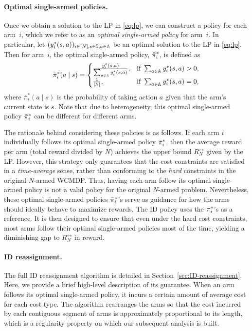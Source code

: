 \documentclass[11pt,letterpaper]{article}
\begin{document}
\paragraph{Optimal single-armed policies.}
Once we obtain a solution to the LP in \eqref{eq:lp}, we can construct a policy for each arm~$i$, which we refer to as an \emph{optimal single-armed policy} for arm~$i$.
In particular, let $(y^*_i(s,a))_{i\in [N], s\in\mathbb{S},a\in\mathbb{A}}$ be an optimal solution to the LP in \eqref{eq:lp}.
Then for arm~$i$, the optimal single-armed policy, ${\bar{\pi}}^*_i$, is defined as
\begin{equation}\label{eq:optimal-single-armed-policy}
    \bar{\pi}_i^*(a\mid s) = \begin{cases}
        \frac{y^*_i(s,a)}{\sum_{a\in\mathbb{A}}y^*_i(s,a)}, & \text{if}~ \sum_{a\in\mathbb{A}}y^*_i(s,a) >0,\\
        \frac{1}{\lvert\mathbb{A}\rvert}, &  \text{if} ~\sum_{a\in\mathbb{A}}y^*_i(s,a)=0,
    \end{cases}
\end{equation}
where $\bar{\pi}_i^*(a\mid s)$ is the probability of taking action $a$ given that the arm's current state is $s$.
Note that due to heterogeneity, this optimal single-armed policy ${\bar{\pi}}^*_i$ can be different for different arms.


The rationale behind considering these policies is as follows.
If each arm $i$ individually follows its optimal single-armed policy ${\bar{\pi}}_i^*$, then the average reward per arm (total reward divided by $N$) achieves the upper bound $R_N^{\rel}$ given by the LP.
However, this strategy only guarantees that the cost constraints are satisfied in a \emph{time-average} sense, rather than conforming to the \emph{hard} constraints in the original $N$-armed WCMDP.
Thus, having each arm follow its optimal single-armed policy is not a valid policy for the original $N$-armed problem.
Nevertheless, these optimal single-armed policies ${\bar{\pi}}_i^*$'s serve as guidance for how the arms should ideally behave to maximize rewards.
The ID policy uses the ${\bar{\pi}}_i^*$'s as a reference.
It is then designed to ensure that even under the hard cost constraints, most arms follow their optimal single-armed policies most of the time, yielding a diminishing gap to $R_N^{\rel}$ in reward.

\paragraph{ID reassignment.}
The full ID reassignment algorithm is detailed in Section~\ref{sec:ID-reassignment}.
Here, we provide a brief high-level description of its guarantee.
When an arm follows its optimal single-armed policy, it incurs a certain amount of average cost for each cost type. 
The algorithm rearranges the arms so that the cost incurred by each contiguous segment of arms is approximately proportional to its length, which is a regularity property on which our subsequent analysis is built. 
\end{document}
